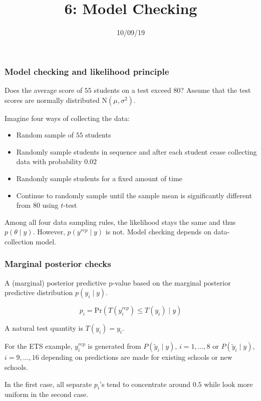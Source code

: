 \documentclass{beamer}
\title["6"]{6: Model Checking}
\date{10/09/19}
\begin{document}

\begin{frame}
\titlepage 
\end{frame}


\begin{frame}
\frametitle{Model checking and likelihood principle}  
Does the average score of $55$ students on a test exceed $80$? Assume
that the test scores are normally distributed $\mbox{N}(\mu,\sigma^2)$.
\newline

Imagine four ways of collecting the data:

\begin{itemize}
\item Random sample of $55$ students
\item Randomly sample students in sequence and after each student
  cease collecting data with probability $0.02$
\item Randomly sample students for a fixed amount of time
\item Continue to randomly sample until the sample mean is
  significantly different from $80$ using $t$-test
\end{itemize}

Among all four data sampling rules, the likelihood stays the same and thus $p(\theta \mid y)$. However,
$p(y^{rep} \mid y)$ is not. Model checking depends on
data-collection model.
\end{frame}

\begin{frame}
\frametitle{Marginal posterior checks}
A (marginal) posterior predictive p-value based on the marginal
posterior predictive distribution $p(y_i \mid y)$.

\[
p_i = \mbox{Pr}(T(y_i^{rep}) \leq T(y_i) \mid y)
\]  

A natural test quantity is $T(y_i) = y_i$.
\newline 

For the ETS example, $y_i^{rep}$ is generated from $P(\tilde{y}_i\mid
y)$, $i = 1,\ldots,8$ or $P(\tilde{y}_i\mid
y)$, $i = 9, \ldots, 16$ depending on predictions are made for
existing schools or new schools. 
\newline 

In the first case, all separate $p_i$'s tend to concentrate around
$0.5$ while look more uniform in the second case. 
\end{frame}
\end{document}
